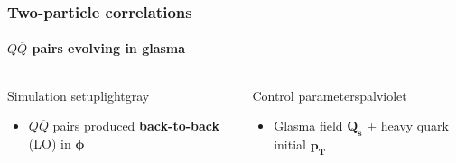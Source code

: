 \documentclass[aspectratio=169,11pt,usenames,dvipsnames]{beamer}
\begin{document}
\begin{frame}
    \frametitle{Two-particle correlations}
    \framesubtitle{$Q\overline{Q}$ pairs evolving in glasma}
    \vspace{-15pt}
    \begin{center}
        \begin{columns}[onlytextwidth,t]
           \begin{center}
                \begin{custombox2}{\normalsize Simulation setup}{lightgray}
                    \small
                    \begin{varwidth}{\textwidth}
                    \begin{itemize}\itemsep0em 
                        \itemsep0em
                        \footnotesize
                        \item $Q\overline{Q}$ pairs produced {\bfseries back-to-back} (LO) in $\boldsymbol{\phi}$
                    \end{itemize}
                    \end{varwidth}
                \end{custombox2}
            \end{center}
            \begin{center}
                \begin{custombox2}{\normalsize Control parameters}{palviolet}
                    \small
                    \begin{varwidth}{0.95\textwidth}
                    \begin{itemize}\itemsep0em 
                        \itemsep0em
                        \footnotesize
                        \item Glasma field {\color{palviolet}$\boldsymbol{Q_s}$} + heavy quark initial {\color{palviolet}$\boldsymbol{p_T}$}
                    \end{itemize}
                    \end{varwidth}
                \end{custombox2}
            \end{center}
        \end{columns}    


\end{center}
\end{frame}
\end{document}
